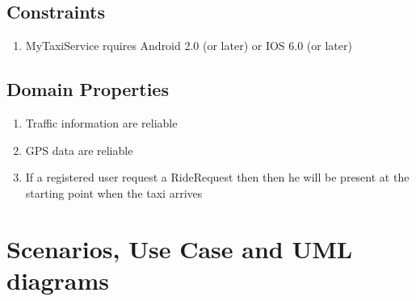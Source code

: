 \documentclass[11pt,titlepage]{article} %
\begin{document}
    \subsection{Constraints}
	\begin{enumerate}
	      \item MyTaxiService rquires Android 2.0 (or later) or IOS 6.0 (or later)
	\end{enumerate}

    \subsection {Domain Properties}
	\begin{enumerate}
	      \item Traffic information are reliable
	      \item GPS data are reliable
	      \item If a registered user request a RideRequest then then he will be present at the starting point when the taxi arrives
	\end{enumerate}

\section {Scenarios, Use Case and UML diagrams}
\end{document}
